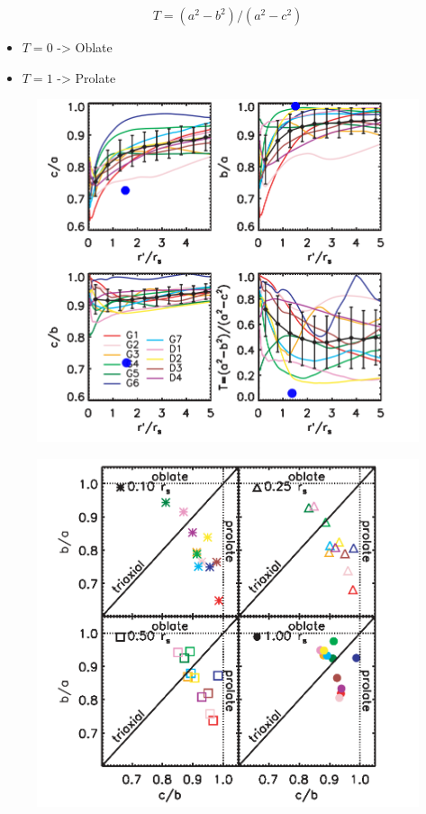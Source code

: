 \documentclass[12pt]{article}
\begin{document}
\begin{equation}
T = (a^2 - b^2)/(a^2-c^2)
\end{equation}

\begin{itemize}
\item $T=0$ -> Oblate
\item $T=1$ -> Prolate 
\end{itemize}


\begin{figure}[H]
\centering
\includegraphics[scale=0.5]{hayashimod.png}
\end{figure}

\begin{figure}[H]
\centering
\includegraphics[scale=0.5]{prolateoblatehayashi.png}
\end{figure}
\end{document}
